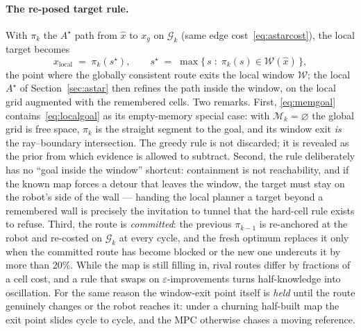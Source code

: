 \documentclass[11pt,a4paper]{article}
\newcommand{\astar}{$A^\star$}
\begin{document}
\paragraph{The re-posed target rule.} With $\pi_k$ the \astar{} path from $\hat x$ to $x_g$ on
$\mathcal{G}_k$ (same edge cost~\eqref{eq:astarcost}), the local target becomes
\begin{equation}
  x_{\mathrm{local}} \;=\; \pi_k(s^\star),
  \qquad
  s^\star \;=\; \max\{\,s \;:\; \pi_k(s)\in\mathcal{W}(\hat x)\,\},
  \label{eq:memgoal}
\end{equation}
the point where the globally consistent route exits the local window $\mathcal{W}$; the local \astar{} of
Section~\ref{sec:astar} then refines the path inside the window, on the local grid augmented with the
remembered cells. Two remarks. First, \eqref{eq:memgoal} contains~\eqref{eq:localgoal} as its empty-memory
special case: with $\mathcal{M}_k=\varnothing$ the global grid is free space, $\pi_k$ is the straight
segment to the goal, and its window exit \emph{is} the ray--boundary intersection. The greedy rule is not
discarded; it is revealed as the prior from which evidence is allowed to subtract. Second, the rule
deliberately has no ``goal inside the window'' shortcut: containment is not reachability, and if the known
map forces a detour that leaves the window, the target must stay on the robot's side of the wall ---
handing the local planner a target beyond a remembered wall is precisely the invitation to tunnel that the
hard-cell rule exists to refuse. Third, the route is \emph{committed}: the previous $\pi_{k-1}$ is
re-anchored at the robot and re-costed on $\mathcal{G}_k$ at every cycle, and the fresh optimum replaces it
only when the committed route has become blocked or the new one undercuts it by more than $20\%$. While the
map is still filling in, rival routes differ by fractions of a cell cost, and a rule that swaps on
$\varepsilon$-improvements turns half-knowledge into oscillation. For the same reason the window-exit
point itself is \emph{held} until the route genuinely changes or the robot reaches it: under a churning
half-built map the exit point slides cycle to cycle, and the MPC otherwise chases a moving reference.
\end{document}
